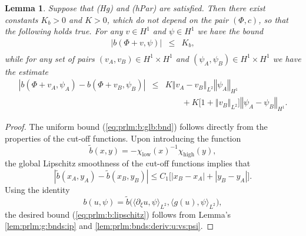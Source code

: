 \documentclass[10pt]{articleHJ}
\newcommand{\abs}[1]{\left\vert#1\right\vert}			%
\newcommand{\norm}[1]{\left\Vert#1\right\Vert}		%
\newcommand{\sref}[1]{(\ref{#1})}                       %
\newtheorem{lem}[thm]{Lemma}
\numberwithin{equation}{section}
\begin{document}
\begin{lem}
\label{lem:prlm:bnds:b}
Suppose that (Hg)
and (hPar) are satisfied.
Then there exist constants $K_b > 0$
and $K > 0$,
which do not
depend on the pair $(\Phi, c)$, so that the following holds true.
%
For any $v \in H^1$ and $\psi \in H^1$
we have the bound
\begin{equation}
  \label{eq:prlm:b:glb:bnd}
  \begin{array}{lcl}
      \abs{b(\Phi + v, \psi)}  & \le &
        K_b,
     \\[0.2cm]
  \end{array}
\end{equation}
while for any set of pairs
$(v_A , v_B) \in H^1 \times H^1$
and $(\psi_A, \psi_B) \in H^1 \times H^1$
we have the estimate
\begin{equation}
\label{eq:prlm:b:lipschitz}
    \begin{array}{lcl}
      \abs{b(\Phi + v_A , \psi_A) - b(\Phi + v_B, \psi_B) }
        & \le &
           K \norm{v_A-v_B}_{L^2}
             \norm{\psi_A}_{H^1}
   \\[0.2cm]
   & & \qquad
           + K \big[ 1 +  \norm{v_B}_{L^2} \big]
              \norm{\psi_A - \psi_B}_{H^1}.
    \end{array}
\end{equation}
\end{lem}
\begin{proof}
The uniform bound \sref{eq:prlm:b:glb:bnd}
follows directly from the properties of the cut-off functions.
Upon introducing the function
\begin{equation}
\tilde{b}(x,y)
= - \chi_{\mathrm{low}}( x)^{-1} \chi_{\mathrm{high}}(y),
\end{equation}
the global Lipschitz smoothness of the cut-off functions
implies that
\begin{equation}
\abs{
  \tilde{b}(x_A ,y_A)
 - \tilde{b}(x_B , y_B)
}
\le C_1 \big[ \abs{x_B - x_A}
+ \abs{y_B - y_A} \big].
\end{equation}
Using the identity
\begin{equation}
b(u, \psi)
= \tilde{b}\Big( \langle \partial_\xi u , \psi \rangle_{L^2} ,
    \langle g(u), \psi \rangle_{L^2} \Big),
\end{equation}
the desired bound \sref{eq:prlm:b:lipschitz}
follows from Lemma's
\ref{lem:prlm:g:bnds:ip}
and
\ref{lem:prlm:bnds:deriv:u:vs:psi}.
\end{proof}
\end{document}
